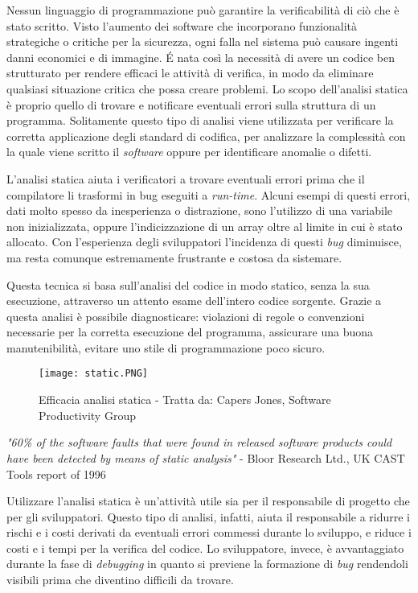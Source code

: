 Nessun linguaggio di programmazione può garantire la verificabilità di ciò che è stato scritto. Visto l'aumento dei software che incorporano funzionalità strategiche o critiche per la sicurezza, ogni falla nel sistema può causare ingenti danni economici e di immagine. É nata così la necessità di avere un codice ben strutturato per rendere efficaci le attività di verifica, in modo da eliminare qualsiasi situazione critica che possa creare problemi. Lo scopo dell'analisi statica è proprio quello di trovare e notificare eventuali errori sulla struttura di un programma. Solitamente questo tipo di analisi viene utilizzata per verificare la corretta applicazione degli standard di codifica, per analizzare la complessità con la quale viene scritto il \textit{software} oppure per identificare anomalie o difetti.

L'analisi statica aiuta i verificatori a trovare eventuali errori prima che il compilatore li trasformi in bug eseguiti a \textit{run-time}. Alcuni esempi di questi errori, dati molto spesso da inesperienza o distrazione, sono l'utilizzo di una variabile non inizializzata, oppure l'indicizzazione di un array oltre al limite in cui è stato allocato. Con l'esperienza degli sviluppatori l'incidenza di questi \textit{bug} diminuisce, ma resta comunque estremamente frustrante e costosa da sistemare.

Questa tecnica si basa sull'analisi del codice in modo statico, senza la sua esecuzione, attraverso un attento esame dell'intero codice sorgente. Grazie a questa analisi è possibile diagnosticare: violazioni di regole o convenzioni necessarie per la corretta esecuzione del programma, assicurare una buona manutenibilità, evitare uno stile di programmazione poco sicuro.

\begin{figure}[H]
  \centering
  \texttt{[image: static.PNG]}
  \caption{Efficacia analisi statica - Tratta da: Capers Jones, Software Productivity Group}
\end{figure}

\textit{"60\% of the software faults that were found in released software products could have been detected by means of static analysis"} - Bloor Research Ltd., UK CAST Tools report of 1996

Utilizzare l'analisi statica è un'attività utile sia per il responsabile di progetto che per gli sviluppatori. Questo tipo di analisi, infatti, aiuta il responsabile a ridurre i rischi e i costi derivati da eventuali errori commessi durante lo sviluppo, e riduce i costi e i tempi per la verifica del codice. Lo sviluppatore, invece, è avvantaggiato durante la fase di \textit{debugging} in quanto si previene la formazione di \textit{bug} rendendoli visibili prima che diventino difficili da trovare.

